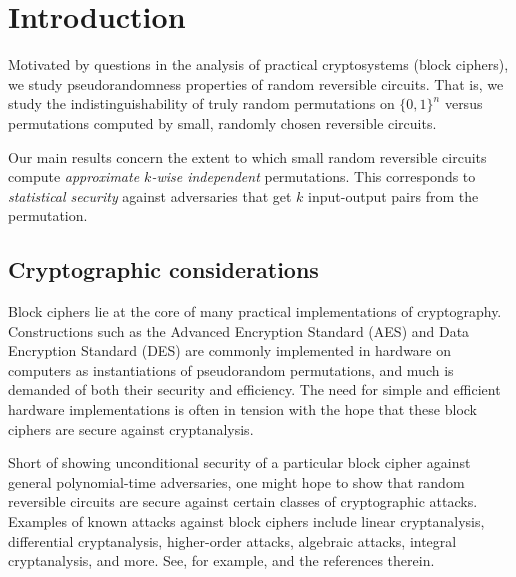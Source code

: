 \section{Introduction}
Motivated by questions in the analysis of practical cryptosystems (block ciphers), we study pseudorandomness properties of random reversible circuits. That is, we study the indistinguishability of truly random permutations on $\{0,1\}^n$ versus permutations computed by small, randomly chosen reversible circuits. 

Our main results concern the extent to which small random reversible circuits compute \emph{approximate $k$-wise independent} permutations. This corresponds to \emph{statistical security} against adversaries that get $k$ input-output pairs from the permutation. 

\subsection{Cryptographic considerations}\label{sec:crypto}
Block ciphers lie at the core of many practical implementations of cryptography. Constructions such as the Advanced Encryption Standard (AES) and Data Encryption Standard (DES) are commonly implemented in hardware on computers as instantiations of pseudorandom permutations, and much is demanded of both their security and efficiency. The need for simple and efficient hardware implementations is often in tension with the hope that these block ciphers are secure against cryptanalysis.

Short of showing unconditional security of a particular block cipher against general polynomial-time adversaries, one might hope to show that random reversible circuits are secure against certain classes of cryptographic attacks. Examples of known attacks against block ciphers include linear cryptanalysis, differential cryptanalysis, higher-order attacks, algebraic attacks, integral cryptanalysis, and more. See, for example, \cite{liu2021t,liu2023layout} and the references therein.

